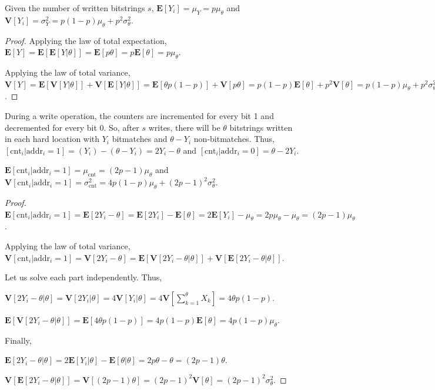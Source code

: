 \begin{theorem}
Given the number of written bitstrings $s$, $\mathbf{E}[Y_i] = \mu_Y = p \mu_\theta$ and $\mathbf{V}[Y_i] = \sigma^2_Y = p(1-p) \mu_\theta + p^2 \sigma^2_\theta$.
\end{theorem}
\begin{proof}
Applying the law of total expectation, $\mathbf{E}[Y] = \mathbf{E}[\mathbf{E}[Y|\theta]] = \mathbf{E}[p \theta] = p \mathbf{E}[\theta] = p \mu_\theta$.

Applying the law of total variance, $\mathbf{V}[Y] = \mathbf{E}[\mathbf{V}[Y|\theta]] + \mathbf{V}[\mathbf{E}[Y|\theta]] = \mathbf{E}[\theta p (1-p)] + \mathbf{V}[p \theta] = p(1-p) \mathbf{E}[\theta] + p^2 \mathbf{V}[\theta] = p(1-p) \mu_\theta + p^2 \sigma^2_\theta$.
\end{proof}

During a write operation, the counters are incremented for every bit 1 and decremented for every bit 0. So, after $s$ writes, there will be $\theta$ bitstrings written in each hard location with $Y_i$ bitmatches and $\theta - Y_i$ non-bitmatches. Thus, $[\text{cnt}_i | \text{addr}_i = 1] = (Y_i) - (\theta - Y_i) = 2Y_i - \theta$ and $[\text{cnt}_i | \text{addr}_i = 0] = \theta - 2Y_i$.

\begin{theorem}
$\mathbf{E}[\text{cnt}_i | \text{addr}_i = 1] = \mu_{\text{cnt}} = (2p-1) \mu_\theta$ and $\mathbf{V}[\text{cnt}_i | \text{addr}_i = 1] = \sigma^2_\text{cnt} = 4p(1-p) \mu_\theta + (2p-1)^2 \sigma^2_\theta$.
\end{theorem}

\begin{proof}

$\mathbf{E}[\text{cnt}_i | \text{addr}_i = 1] = \mathbf{E}[2Y_i - \theta] = \mathbf{E}[2Y_i] - \mathbf{E}[\theta] = 2 \mathbf{E}[Y_i] - \mu_\theta = 2 p \mu_\theta - \mu_\theta = (2p-1) \mu_\theta$.

Applying the law of total variance, $\mathbf{V}[\text{cnt}_i | \text{addr}_i = 1] = \mathbf{V}[2Y_i - \theta] = \mathbf{E}[\mathbf{V}[2Y_i - \theta | \theta]] + \mathbf{V}[\mathbf{E}[2Y_i - \theta | \theta]]$.

Let us solve each part independently. Thus,

$\mathbf{V}[2Y_i - \theta | \theta] = \mathbf{V}[2Y_i | \theta] = 4 \mathbf{V}[Y_i | \theta] = 4 \mathbf{V}[\sum_{k=1}^\theta X_k] = 4 \theta p (1-p)$.

$\mathbf{E}[\mathbf{V}[2Y_i - \theta | \theta]] = \mathbf{E}[4 \theta p (1-p)] = 4p(1-p) \mathbf{E}[\theta] = 4p(1-p) \mu_\theta$.

Finally,

$\mathbf{E}[2Y_i - \theta | \theta] = 2 \mathbf{E}[Y_i | \theta] - \mathbf{E}[\theta | \theta] = 2p \theta - \theta = (2p-1) \theta$.

$\mathbf{V}[\mathbf{E}[2Y_i - \theta | \theta]] = \mathbf{V}[(2p-1) \theta] = (2p-1)^2 \mathbf{V}[\theta] = (2p-1)^2 \sigma^2_\theta$.
\end{proof}

